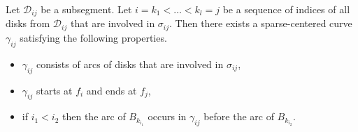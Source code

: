 



\begin{claim}\label{lemma:can-construct-gamma-ij}
Let $\mathcal{D}_{ij}$ be a subsegment. Let $i = k_1 < \ldots < k_l = j$ be a sequence of indices of all disks from $\mathcal{D}_{ij}$ that are involved in $\sigma_{ij}$. Then there exists a sparse-centered curve $\gamma_{ij}$ satisfying the following properties.
\begin{itemize}
    \item $\gamma_{ij}$ consists of arcs of disks that are involved in $\sigma_{ij}$,
    \item $\gamma_{ij}$ starts at $f_i$ and ends at $f_j$,
    \item if $i_1 < i_2$ then the arc of $B_{k_{i_1}}$ occurs in $\gamma_{ij}$ before the arc of $B_{k_{i_2}}$.
\end{itemize}
\end{claim}

